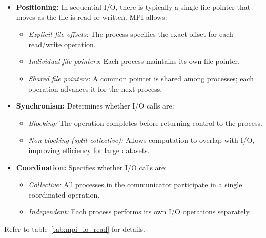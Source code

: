 \documentclass[12pt]{book}
\begin{document}
\begin{itemize}
    \item \textbf{Positioning:} In sequential I/O, there is typically a single file pointer that moves as the file is read or written. MPI allows:
    \begin{itemize}
        \item \textit{Explicit file offsets}: The process specifies the exact offset for each read/write operation.
        \item \textit{Individual file pointers}: Each process maintains its own file pointer.
        \item \textit{Shared file pointers}: A common pointer is shared among processes; each operation advances it for the next process.
    \end{itemize}

    \item \textbf{Synchronism:} Determines whether I/O calls are:
    \begin{itemize}
        \item \textit{Blocking:} The operation completes before returning control to the process.
        \item \textit{Non-blocking (split collective):} Allows computation to overlap with I/O, improving efficiency for large datasets.
    \end{itemize}

    \item \textbf{Coordination:} Specifies whether I/O calls are:
    \begin{itemize}
        \item \textit{Collective:} All processes in the communicator participate in a single coordinated operation.
        \item \textit{Independent:} Each process performs its own I/O operations separately.
    \end{itemize}
\end{itemize}
Refer to table~\ref{tab:mpi_io_read} for details.
\end{document}
